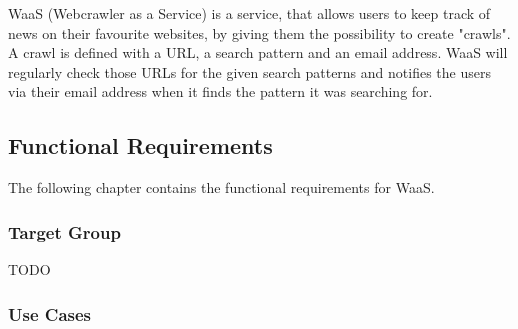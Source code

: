 \documentclass[titlepage, 12pt]{article}
\begin{document}
WaaS (Webcrawler as a Service) is a service, that allows users to keep track of news on their favourite websites, by giving them the possibility to create "crawls". A crawl is defined with a URL, a search pattern and an email address. WaaS will regularly check those URLs for the given search patterns and notifies the users via their email address when it finds the pattern it was searching for.

\subsection{Functional Requirements}

The following chapter contains the functional requirements for WaaS.

\subsubsection{Target Group}

TODO

\subsubsection{{Use Cases}}
\end{document}
